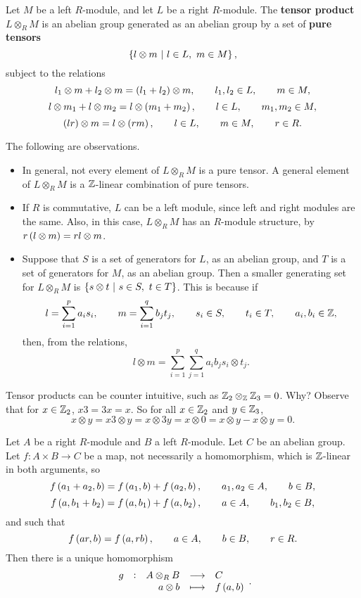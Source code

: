 \begin{definition}
Let $ M $ be a left $ R $-module, and let $ L $ be a right $ R $-module. The \textbf{tensor product} $ L \otimes_R M $ is an abelian group generated as an abelian group by a set of \textbf{pure tensors}
$$ \cbr{l \otimes m \st l \in L, \ m \in M}, $$
subject to the relations
$$ l_1 \otimes m + l_2 \otimes m = \br{l_1 + l_2} \otimes m, \qquad l_1, l_2 \in L, \qquad m \in M, $$
$$ l \otimes m_1 + l \otimes m_2 = l \otimes \br{m_1 + m_2}, \qquad l \in L, \qquad m_1, m_2 \in M, $$
$$ \br{lr} \otimes m = l \otimes \br{rm}, \qquad l \in L, \qquad m \in M, \qquad r \in R. $$
\end{definition}

The following are observations.
\begin{itemize}
\item In general, not every element of $ L \otimes_R M $ is a pure tensor. A general element of $ L \otimes_R M $ is a $ \mathbb{Z} $-linear combination of pure tensors.
\item If $ R $ is commutative, $ L $ can be a left module, since left and right modules are the same. Also, in this case, $ L \otimes_R M $ has an $ R $-module structure, by $ r\br{l \otimes m} = rl \otimes m $.
\item Suppose that $ S $ is a set of generators for $ L $, as an abelian group, and $ T $ is a set of generators for $ M $, as an abelian group. Then a smaller generating set for $ L \otimes_R M $ is $ \cbr{s \otimes t \st s \in S, \ t \in T} $. This is because if
$$ l = \sum_{i = 1}^p a_is_i, \qquad m = \sum_{i = 1}^q b_jt_j, \qquad s_i \in S, \qquad t_i \in T, \qquad a_i, b_i \in \mathbb{Z}, $$
then, from the relations,
$$ l \otimes m = \sum_{i = 1}^p \sum_{j = 1}^q a_ib_js_i \otimes t_j. $$
\end{itemize}

\begin{example*}
Tensor products can be counter intuitive, such as $ \mathbb{Z}_2 \otimes_{\mathbb{Z}} \mathbb{Z}_3 = 0 $. Why? Observe that for $ x \in \mathbb{Z}_2 $, $ x3 = 3x = x $. So for all $ x \in \mathbb{Z}_2 $ and $ y \in \mathbb{Z}_3 $,
$$ x \otimes y = x3 \otimes y = x \otimes 3y = x \otimes 0 = x \otimes y - x \otimes y = 0. $$
\end{example*}


\begin{theorem}
Let $ A $ be a right $ R $-module and $ B $ a left $ R $-module. Let $ C $ be an abelian group. Let $ f : A \times B \to C $ be a map, not necessarily a homomorphism, which is $ \mathbb{Z} $-linear in both arguments, so
$$ f\br{a_1 + a_2, b} = f\br{a_1, b} + f\br{a_2, b}, \qquad a_1, a_2 \in A, \qquad b \in B, $$
$$ f\br{a, b_1 + b_2} = f\br{a, b_1} + f\br{a, b_2}, \qquad a \in A, \qquad b_1, b_2 \in B, $$
and such that
$$ f\br{ar, b} = f\br{a, rb}, \qquad a \in A, \qquad b \in B, \qquad r \in R. $$
Then there is a unique homomorphism
$$ \function[g]{A \otimes_R B}{C}{a \otimes b}{f\br{a, b}}. $$
\end{theorem}

